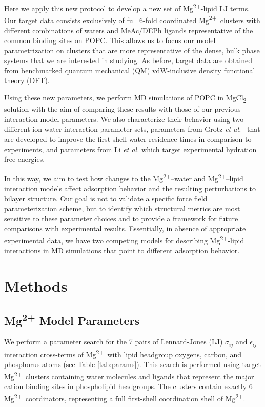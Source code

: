 \documentclass[journal=langd5,manuscript=article]{achemso}
\newcommand{\etal}{\textit{et al.}}
\newcommand{\mg}{Mg\textsuperscript{2+}}
\newcommand{\mgcl}{MgCl\textsubscript{2}}
\newcommand{\sigmaij}{$\sigma_{ij}$}
\newcommand{\epsilonij}{$\epsilon_{ij}$}
\begin{document}
Here we apply this new protocol to develop a new set of \mg{}-lipid LJ
terms. Our target data consists exclusively of full 6-fold coordinated \mg~clusters with 
different combinations of waters and MeAc/DEPh ligands representative of the common binding sites on POPC.
This allows us to focus our model parametrization on clusters that are more representative of the dense, bulk phase systems that we are interested in studying. 
As before, target data are obtained from benchmarked quantum mechanical (QM) vdW-inclusive density functional theory (DFT).

Using these new parameters, we perform MD simulations of POPC in \mgcl{} solution with the aim of comparing these results
with those of our previous interaction model parameters. We also characterize their behavior using two different
ion-water interaction parameter sets, parameters from Grotz \etal~\cite{grotz:2021:optimized,micro} that are developed to
improve the first shell water residence times in comparison to experiments, and parameters from Li
\etal{}\cite{merzhfe} which target experimental hydration free energies.

In this way, we aim to test how changes to the \mg–water and \mg–lipid interaction models affect adsorption behavior and
the resulting perturbations to bilayer structure. Our goal is not to validate a specific force field parameterization scheme,
but to identify which structural metrics are most sensitive to these parameter choices and to provide a framework for future
comparisons with experimental results. 
Essentially, in absence of appropriate experimental data, we have two competing models for describing \mg-lipid interactions
in MD simulations that point to different adsorption behavior.

\section{Methods}
\subsection{\mg{} Model Parameters}

We perform a parameter search for the 7 pairs of Lennard-Jones (LJ) \sigmaij{} and \epsilonij{} interaction
cross-terms of \mg~with lipid headgroup oxygens, carbon, and phosphorus atoms (see Table \ref{tab:params}). 
This search is performed using target 
\mg~clusters containing water molecules and ligands that represent the major cation binding sites in phospholipid headgroups. 
The clusters contain exactly 6 \mg~coordinators, representing a full first-shell coordination shell of \mg.
\end{document}
